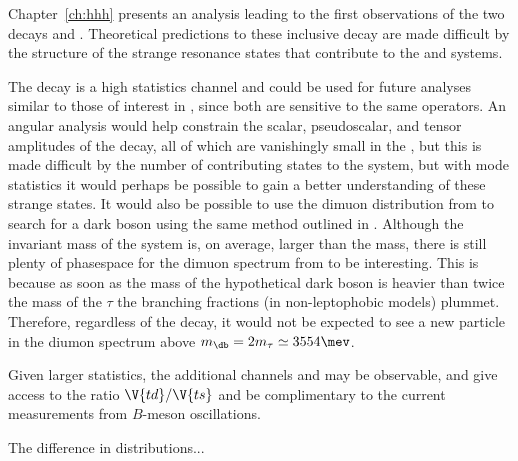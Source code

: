 


Chapter~\ref{ch:hhh} presents an analysis leading to the first observations of the two decays
\btokpipimumu and \btophikmumu.
Theoretical predictions to these inclusive decay are made difficult by the structure of the strange
resonance states that contribute to the \kpipi and \phik systems.

The decay \btokpipimumu is a high statistics channel and could be used for future analyses similar to
those of interest in \btokstrmumu, since both are sensitive to the same operators.
An angular analysis would help constrain the scalar, pseudoscalar, and tensor amplitudes of the
decay, all of which are vanishingly small in the \sm, but this is made difficult by the number of
contributing states to the \kpipi system,
but with mode statistics it would perhaps be possible to gain a better understanding of these
strange states.
It would also be possible to use the dimuon distribution from \btokpipimumu to search for a dark
boson using the same method outlined in .
Although the invariant mass of the \kpipi system is, on average, larger than the \Kstarz mass,
there is still plenty of phasespace for the dimuon spectrum from \btokpipimumu to be interesting.
This is because as soon as the mass of the hypothetical dark boson is heavier than twice the mass
of the $\tau$ the branching fractions (in non-leptophobic models) plummet.
Therefore, regardless of the decay, it would not be expected to see a new particle in the diumon
spectrum above $m_\db=2m_\tau\simeq3554\mev$.

Given larger statistics, the additional channels \decay{\Bp}{\Kp\Km\pip} and \decay{\Bp}{\pip\pipi}
may be observable, and give access to the ratio $\V{td}/\V{ts}$ and be complimentary to the current
measurements from $B$-meson oscillations.

The difference in \kpipi distributions...

